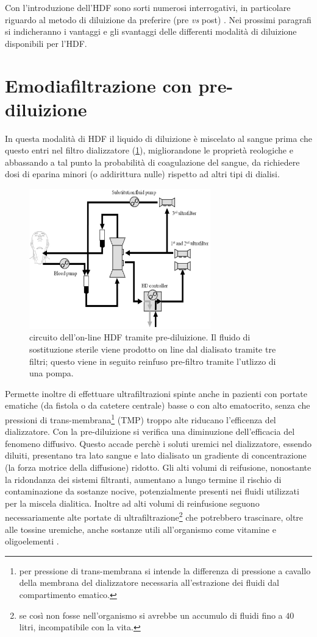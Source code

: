 Con l'introduzione dell'HDF sono sorti numerosi interrogativi, in particolare riguardo al metodo di diluizione da preferire (pre \textit{vs} post) \cite{masakane, colussi}. Nei prossimi paragrafi si indicheranno i vantaggi e gli svantaggi delle differenti modalità di diluizione disponibili per l'HDF.

\section{Emodiafiltrazione con pre-diluizione}
In questa modalità di HDF il liquido di diluizione è miscelato al sangue prima che questo entri nel filtro dializzatore (\figurename\ref{pre}), migliorandone le proprietà reologiche e abbassando a tal punto la probabilità di coagulazione del sangue, da richiedere dosi di eparina minori (o addirittura nulle) rispetto ad altri tipi di dialisi. 
\begin{figure}[htb]
	\centering
		\includegraphics[width=0.7\textwidth]{immagini/NIC/pre.eps}
		\caption{circuito dell'on-line HDF tramite pre-diluizione. Il fluido di sostituzione sterile viene prodotto on line dal dialisato tramite tre filtri; questo viene in seguito reinfuso pre-filtro tramite l'utlizzo di una pompa.}\label{pre}
\end{figure}
Permette inoltre di effettuare ultrafiltrazioni spinte anche in pazienti con portate ematiche (da fistola o da catetere centrale) basse o con alto ematocrito, senza che pressioni di trans-membrana\footnote{per pressione di trans-membrana si intende la differenza di pressione a cavallo della membrana del dializzatore necessaria all'estrazione dei fluidi dal compartimento ematico.} (TMP) troppo alte riducano l'efficenza del dializzatore. Con la pre-diluizione si verifica una diminuzione dell'efficacia del fenomeno diffusivo. Questo accade perchè i soluti uremici nel dializzatore, essendo diluiti, presentano tra lato sangue e lato dialisato un gradiente di concentrazione (la forza motrice della diffusione) ridotto. Gli alti volumi di reifusione, nonostante la ridondanza dei sistemi filtranti, aumentano a lungo termine il rischio di contaminazione da sostanze nocive, potenzialmente presenti nei fluidi utilizzati per la miscela dialitica. Inoltre ad alti volumi di reinfusione seguono necessariamente alte portate di ultrafiltrazione\footnote{se così non fosse nell'organismo si avrebbe un accumulo di fluidi fino a $40$ litri, incompatibile con la vita.} che potrebbero trascinare, oltre alle tossine uremiche, anche sostanze utili all'organismo come vitamine e oligoelementi \cite{colussi}.


